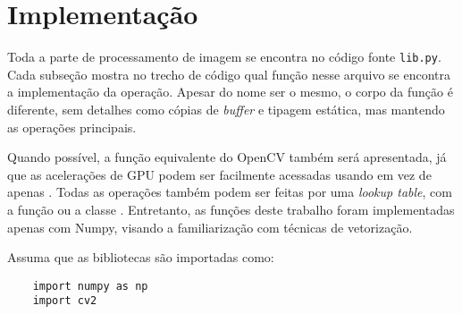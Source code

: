 \section{Implementação} \label{sec:impl}

Toda a parte de processamento de imagem se encontra no código fonte \texttt{lib.py}. Cada subseção mostra no trecho de código qual função nesse arquivo se encontra a implementação da operação. Apesar do nome ser o mesmo, o corpo da função é diferente, sem detalhes como cópias de \textit{buffer} e tipagem estática, mas mantendo as operações principais.

Quando possível, a função equivalente do OpenCV também será apresentada, já que as acelerações de GPU podem ser facilmente acessadas usando  em vez de apenas  \autocite{ref:cvcuda}. Todas as operações também podem ser feitas por uma \textit{lookup table}, com a função  \autocite{ref:LUT} ou a classe  \autocite{ref:cudaLUT}. Entretanto, as funções deste trabalho foram implementadas apenas com Numpy, visando a familiarização com técnicas de vetorização.

Assuma que as bibliotecas são importadas como:

\begin{verbatim}
    import numpy as np
    import cv2
\end{verbatim}











